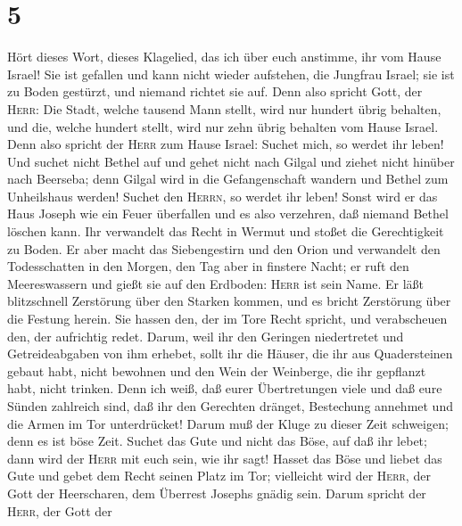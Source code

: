 \hypertarget{section-4}{%
\section{5}\label{section-4}}

 Hört dieses Wort, dieses Klagelied, das ich über euch
anstimme, ihr vom Hause Israel!  Sie ist gefallen und kann
nicht wieder aufstehen, die Jungfrau Israel; sie ist zu Boden gestürzt,
und niemand richtet sie auf.  Denn also spricht Gott, der
\textsc{Herr}: Die Stadt, welche tausend Mann stellt, wird nur hundert
übrig behalten, und die, welche hundert stellt, wird nur zehn übrig
behalten vom Hause Israel.  Denn also spricht der
\textsc{Herr} zum Hause Israel: Suchet mich, so werdet ihr leben!
 Und suchet nicht Bethel auf und gehet nicht nach Gilgal
und ziehet nicht hinüber nach Beerseba; denn Gilgal wird in die
Gefangenschaft wandern und Bethel zum Unheilshaus werden! 
Suchet den \textsc{Herrn}, so werdet ihr leben! Sonst wird er das Haus
Joseph wie ein Feuer überfallen und es also verzehren, daß niemand
Bethel löschen kann.  Ihr verwandelt das Recht in Wermut
und stoßet die Gerechtigkeit zu Boden.  Er aber macht das
Siebengestirn und den Orion und verwandelt den Todesschatten in den
Morgen, den Tag aber in finstere Nacht; er ruft den Meereswassern und
gießt sie auf den Erdboden: \textsc{Herr} ist sein Name. 
Er läßt blitzschnell Zerstörung über den Starken kommen, und es bricht
Zerstörung über die Festung herein.  Sie hassen den, der
im Tore Recht spricht, und verabscheuen den, der aufrichtig redet.
 Darum, weil ihr den Geringen niedertretet und
Getreideabgaben von ihm erhebet, sollt ihr die Häuser, die ihr aus
Quadersteinen gebaut habt, nicht bewohnen und den Wein der Weinberge,
die ihr gepflanzt habt, nicht trinken.  Denn ich weiß,
daß eurer Übertretungen viele und daß eure Sünden zahlreich sind, daß
ihr den Gerechten dränget, Bestechung annehmet und die Armen im Tor
unterdrücket!  Darum muß der Kluge zu dieser Zeit
schweigen; denn es ist böse Zeit.  Suchet das Gute und
nicht das Böse, auf daß ihr lebet; dann wird der \textsc{Herr} mit euch
sein, wie ihr sagt!  Hasset das Böse und liebet das Gute
und gebet dem Recht seinen Platz im Tor; vielleicht wird der
\textsc{Herr}, der Gott der Heerscharen, dem Überrest Josephs gnädig
sein.  Darum spricht der \textsc{Herr}, der Gott der

